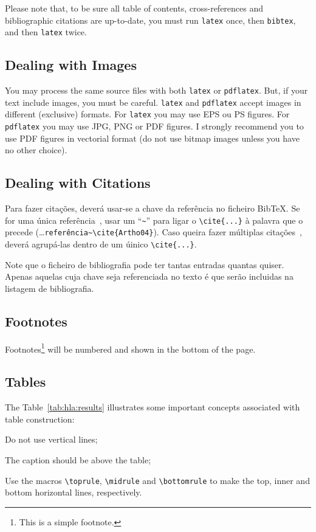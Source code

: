 Please note that, to be sure all table of contents, cross-references and bibliographic citations are up-to-date, you must run \verb!latex! once, then \verb!bibtex!, and then \verb!latex! twice.

\subsection{Dealing with Images} %
\label{sub:dealing_with_images}

You may process the same source files with both \verb!latex! or \verb!pdflatex!. But, if your text include images, you must be careful. \verb!latex! and \verb!pdflatex! accept images in different (exclusive) formats.  For \verb!latex! you may use EPS ou PS figures. For \verb!pdflatex! you may use JPG, PNG or PDF figures.  I strongly recommend you to use PDF figures in vectorial format (do not use bitmap images unless you have no other choice).


\subsection{Dealing with Citations} %

Para fazer citações, deverá usar-se a chave da referência no ficheiro BibTeX. Se for uma única referência~\cite{Artho04}, usar um ``\verb!~!'' para ligar o \verb!\cite{...}! à palavra que o precede (\ldots\verb!referência~\cite{Artho04}!).  Caso queira fazer múltiplas citações~\cite{Shavit95,Silberschatz06,Moss85}, deverá agrupá-las dentro de um úinico \verb!\cite{...}!.

Note que o ficheiro de bibliografia pode ter tantas entradas quantas quiser. Apenas aquelas cuja chave seja referenciada no texto é que serão incluidas na listagem de bibliografia.


\subsection{Footnotes} %

Footnotes\footnote{This is a simple footnote.} will be numbered and shown in the bottom of the page.


\subsection{Tables} %

The Table~\ref{tab:hla:results} illustrates some important concepts associated with table construction:
\begin{asparaenum}[i)]
\item Do not use vertical lines;
\item The caption should be above the table;
\item Use the macros \verb!\toprule!, \verb!\midrule! and \verb!\bottomrule! to make the top, inner and bottom horizontal lines, respectively.
\end{asparaenum}

